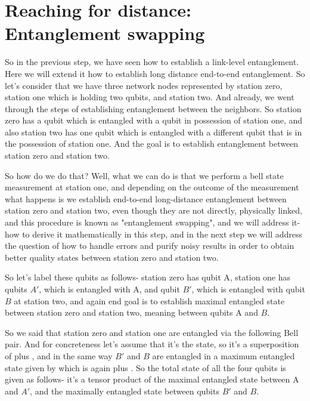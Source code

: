 \section{Reaching for distance: Entanglement swapping}


So in the previous step, we have seen how to establish a link-level entanglement. Here we will extend it how to establish long distance end-to-end entanglement. So let's consider that we have three network nodes represented by station zero, station one which is holding two qubits, and station two. And already, we went through the steps of establishing entanglement between the neighbors. So station zero has a qubit which is entangled with a qubit in possession of station one, and also station two has one qubit which is entangled with a different qubit that is in the possession of station one. And the goal is to establish entanglement between station zero and station two.

So how do we do that? Well, what we can do is that we perform a bell state measurement at station one, and depending on the outcome of the measurement what happens is we establish end-to-end long-distance entanglement between station zero and station two, even though they are not directly, physically linked, and this procedure is known as "entanglement swapping", and we will address it- how to derive it mathematically in this step, and in the next step we will address the question of how to handle errors and purify noisy results in order to obtain better quality states between station zero and station two.

So let's label these qubits as follows- station zero has qubit A, station one has qubits  $A'$, which is entangled with A, and qubit $B'$, which is entangled with qubit $B$ at station two, and again end goal is to establish maximal entangled state between station zero and station two, meaning between qubits A and  $B$.

So we said that station zero and station one are entangled via the following Bell pair. And for concreteness let's assume that it's the  \ket{\Phi^+} state, so it's a superposition of  plus , and in the same way $B'$ and $B$ are entangled in a maximum entangled state given by  \ket{\Phi^+} which is again  plus . So the total state of all the four qubits is given as follows- it's a tensor product of the maximal entangled state  \ket{\Phi^+} between A and  $A'$, and the maximally entangled state  \ket{\Phi^+} between qubits $B'$ and  $B$.

